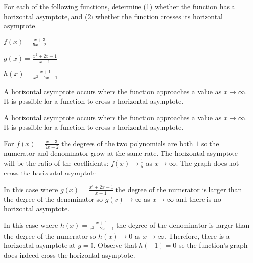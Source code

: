 \begin{activity}\label{A:0.6.5}
	For each of the following functions, determine (1) whether the function has a horizontal asymptote, and (2) whether the function crosses its horizontal asymptote.
\ba
		\item $f(x)=\displaystyle{\frac {x+3}{5x-2}}$
		\item $g(x)=\displaystyle{\frac {x^{2}+2x-1}{x-1}}$
		\item $h(x)=\displaystyle{\frac {x+1}{x^{2}+2x-1}}$
\ea
\end{activity}
\begin{smallhint}
    A horizontal asymptote occurs where the function approaches a value  as $x\to\infty$.
    It is possible for a function to cross a horizontal asymptote.
\end{smallhint}
\begin{bighint}
    A horizontal asymptote occurs where the function approaches a value  as $x\to\infty$.
    It is possible for a function to cross a horizontal asymptote.
\end{bighint}
\begin{activitySolution}
   \ba
        \item For $f(x) = \frac{x+3}{5x-2}$ the degrees of the two polynomials are both $1$
            so the numerator and denominator grow at the same rate.  The horizontal
            asymptote will be the ratio of the coefficients: $f(x) \to
            \frac{1}{5}$ as $x \to \infty$.  The graph does not cross the horizontal
            asymptote.
        \item In this case where $g(x) = \frac{x^2+2x-1}{x-1}$ the degree of the numerator
            is larger than the degree of the denominator so $g(x) \to \infty$ as
            $x\to\infty$ and there is no horizontal asymptote.
        \item In this case where $h(x) = \frac{x+1}{x^2+2x-1}$ the degree of the
            denominator is larger than the degree of the numerator so $h(x) \to 0$ as $x
            \to \infty$.  Therefore, there is a horizontal asymptote at $y=0$.  Observe
            that $h(-1) = 0$ so the function's graph does indeed cross the horizontal
            asymptote.
   \ea
\end{activitySolution}

\aftera
